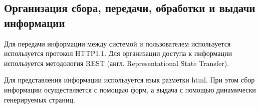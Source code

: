 \subsection{Организация сбора, передачи, обработки и выдачи информации}

Для передачи информации между системой и пользователем используется используется протокол HTTP1.1. Для организации доступа к информации используется методология REST (англ. Representational State Transfer).

Для представления информации используется язык разметки html. При этом сбор информации осуществляется с помощью форм, а выдача с помощью динамически генерируемых страниц.
